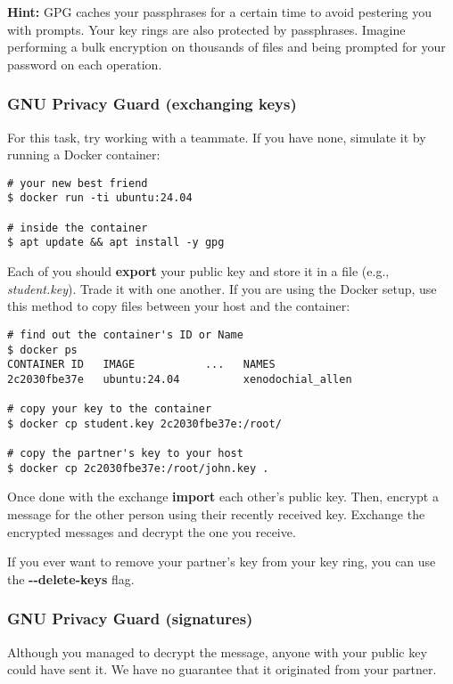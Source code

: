 \textbf{Hint:} GPG caches your passphrases for a certain time to avoid pestering
you with prompts. Your key rings are also protected by passphrases. Imagine
performing a bulk encryption on thousands of files and being prompted for your
password on each operation.

\subsubsection{GNU Privacy Guard (exchanging keys)}

For this task, try working with a teammate. If you have none, simulate it by
running a Docker container:

\begin{lstlisting}[style=bashstyle]
# your new best friend
$ docker run -ti ubuntu:24.04

# inside the container
$ apt update && apt install -y gpg
\end{lstlisting}

Each of you should \textbf{export} your public key and store it in a file
(e.g., \textit{student.key}). Trade it with one another. If you are using the
Docker setup, use this method to copy files between your host and the container:

\begin{lstlisting}[style=bashstyle]
# find out the container's ID or Name
$ docker ps
CONTAINER ID   IMAGE           ...   NAMES
2c2030fbe37e   ubuntu:24.04          xenodochial_allen

# copy your key to the container
$ docker cp student.key 2c2030fbe37e:/root/

# copy the partner's key to your host
$ docker cp 2c2030fbe37e:/root/john.key .
\end{lstlisting}

Once done with the exchange \textbf{import} each other's public key. Then,
encrypt a message for the other person using their recently received key.
Exchange the encrypted messages and decrypt the one you receive.

If you ever want to remove your partner's key from your key ring, you can use
the \textbf{-{-}delete-keys} flag.

\subsubsection{GNU Privacy Guard (signatures)}

Although you managed to decrypt the message, anyone with your public key could
have sent it. We have no guarantee that it originated from your partner.

